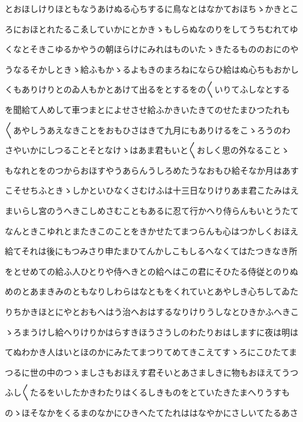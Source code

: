 \documentclass[a4paper,11pt,landscape]{ltjtarticle}
\begin{document}
\par\medskip
とおほしけりほともなうあけぬる心ちするに鳥なとはなかておほちゝかきとこ
\par\medskip
ろにおほとれたるこゑしていかにとかきゝもしらぬなのりをしてうちむれてゆ
\par\medskip
くなとそきこゆるかやうの朝ほらけにみれはものいたゝきたるもののおにのや
\par\medskip
うなるそかしときゝ給ふもかゝるよもきのまろねにならひ給はぬ心ちもおかし
\par\medskip
くもありけりとのゐ人もかとあけて出るをとするをの〱いりてふしなとする
\par\medskip
を聞給て人めして車つまとによせさせ給ふかきいたきてのせたまひつたれも
\par\medskip
〱あやしうあえなきことをおもひさはきて九月にもありけるをこゝろうのわ
\par\medskip
さやいかにしつることそとなけゝはあま君もいと〱おしく思の外なることゝ
\par\medskip
もなれとをのつからおほすやうあらんうしろめたうなおもひ給そなか月はあす
\par\medskip
こそせちふときゝしかといひなくさむけふは十三日なりけりあま君こたみはえ
\par\medskip
まいらし宮のうへきこしめさむこともあるに忍て行かへり侍らんもいとうたて
\par\medskip
なんときこゆれとまたきこのことをきかせたてまつらんも心はつかしくおほえ
\par\medskip
給てそれは後にもつみさり申たまひてんかしこもしるへなくてはたつきなき所
\par\medskip
をとせめての給ふ人ひとりや侍へきとの給へはこの君にそひたる侍従とのりぬ
\par\medskip
めのとあまきみのともなりしわらはなともをくれていとあやしき心ちしてゐた
\par\medskip
りちかきほとにやとおもへはう治へおはするなりけりうしなとひきかふへきこ
\par\medskip
ゝろまうけし給へりけりかはらすきほうさうしのわたりおはしますに夜は明は
\par\medskip
てぬわかき人はいとほのかにみたてまつりてめてきこえてすゝろにこひたてま
\par\medskip
つるに世の中のつゝましさもおほえす君そいとあさましきに物もおほえてうつ
\par\medskip
ふし〱たるをいしたかきわたりはくるしきものをとていたきたまへりうすも
\par\medskip
のゝほそなかをくるまのなかにひきへたてたれははなやかにさしいてたるあさ
\par\medskip
\end{document}

